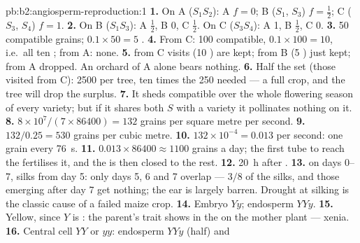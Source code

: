 \begin{solution}{pb:b2:angiosperm-reproduction:1}
\textbf{1.} On A ($S_1S_2$):  A $f = 0$; B ($S_1$, $S_3$) $f =
\tfrac12$; C ($S_3$, $S_4$) $f = 1$.
\textbf{2.} On B ($S_1S_3$): A $\tfrac12$, B 0, C $\tfrac12$. On C
($S_3S_4$): A 1, B $\tfrac12$, C 0.
\textbf{3.} 50 compatible grains; $0.1\times 50 = 5$ .
\textbf{4.} From C: 100 compatible, $0.1\times 100 = 10$, i.e.\ all
ten ; from A: none.
\textbf{5.}  from C visits (10 ) are kept; from B (5 )
just kept; from A dropped. An orchard of A alone bears nothing.
\textbf{6.} Half the  set  (those visited from C): 2500
 per tree, ten times the 250 needed --- a full crop, and the
tree will drop the surplus.
\textbf{7.} It sheds compatible  over the whole flowering season
of every variety; but if it shares both $S$  with a variety
it pollinates nothing on it.
\textbf{8.} $8\times 10^{7}/(7\times 86400) = 132$ grains per square
metre per second.
\textbf{9.} $132/0.25 = 530$ grains per cubic metre.
\textbf{10.} $132\times 10^{-4} = 0.013$ per second: one grain every
\qty{76}{s}.
\textbf{11.} $0.013\times 86400 \approx 1100$ grains a day; the first
tube to reach the  fertilises it, and the  is then closed
to the rest.
\textbf{12.} \qty{20}{h} after .
\textbf{13.}  on days 0--7, silks from day 5: only days 5, 6 and
7 overlap --- $3/8$ of the silks, and those emerging after
day 7 get nothing; the ear is largely barren. Drought at silking is
the classic cause of a failed maize crop.
\textbf{14.} Embryo $Yy$; endosperm $YYy$.
\textbf{15.} Yellow, since $Y$ is : the  parent's trait
shows in the  on the mother plant --- xenia.
\textbf{16.} Central cell $YY$ or $yy$: endosperm $YYy$ (half) and

\end{solution}
